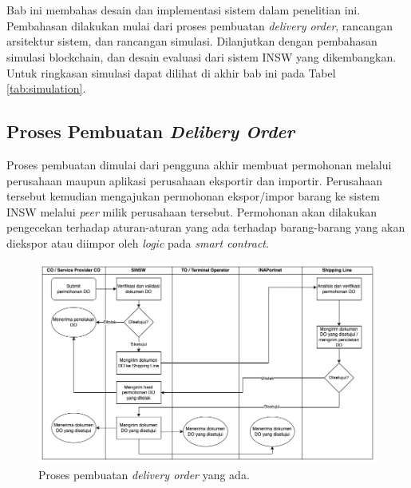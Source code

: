 \chapter{\babEmpat}
\label{bab:4}
Bab ini membahas desain dan implementasi sistem dalam penelitian ini. Pembahasan
dilakukan mulai dari proses pembuatan \textit{delivery order}, rancangan arsitektur sistem, dan rancangan simulasi. Dilanjutkan dengan pembahasan simulasi blockchain, dan desain evaluasi dari sistem INSW yang dikembangkan. Untuk ringkasan simulasi dapat dilihat di akhir bab ini pada Tabel \ref{tab:simulation}.

\section{Proses Pembuatan \textit{Delibery Order}}
\label{sec:proses_do}
Proses pembuatan dimulai dari pengguna akhir membuat permohonan melalui perusahaan maupun aplikasi perusahaan eksportir dan importir. Perusahaan tersebut kemudian mengajukan permohonan ekspor/impor barang ke sistem INSW melalui \textit{peer} milik perusahaan tersebut. Permohonan akan dilakukan pengecekan terhadap aturan-aturan yang ada terhadap barang-barang yang akan diekspor atau diimpor oleh \textit{logic} pada \textit{smart contract}.

\begin{figure}
	\centering
	\includegraphics[width=\textwidth]{assets/pics/request_do.drawio.png}
	\caption{Proses pembuatan \textit{delivery order} yang ada.}
	\label{fig:request_do_classic}
\end{figure}

